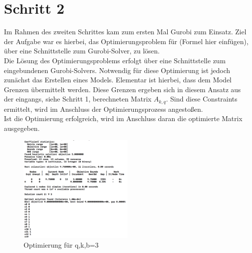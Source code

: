 \section{Schritt 2}
Im Rahmen des zweiten Schrittes kam zum ersten Mal Gurobi zum Einsatz. Ziel der Aufgabe war es hierbei, das Optimierungsproblem für (Formel hier einfügen), über eine Schnittstelle zum Gurobi-Solver, zu lösen. \\
Die Lösung des Optimierungsproblems erfolgt über eine Schnittstelle zum eingebundenen Gurobi-Solvers. Notwendig für diese Optimierung ist jedoch zunächst das Erstellen eines Models. Elementar ist hierbei, dass dem Model Grenzen übermittelt werden. Diese Grenzen ergeben sich in diesem Ansatz aus der eingangs, siehe Schritt 1, berechneten Matrix $A_{k,q}$. Sind diese Constraints ermittelt, wird im Anschluss der Optimierungsprozess angestoßen. \\
Ist die Optimierung erfolgreich, wird im Anschluss daran die optimierte Matrix ausgegeben.

\begin{figure}[h!]
	\centering
	\includegraphics[width=0.5\textwidth]{Pictures/step2_3_3_3}
	\caption{Optimierung für q,k,b=3}
\end{figure}
\newpage